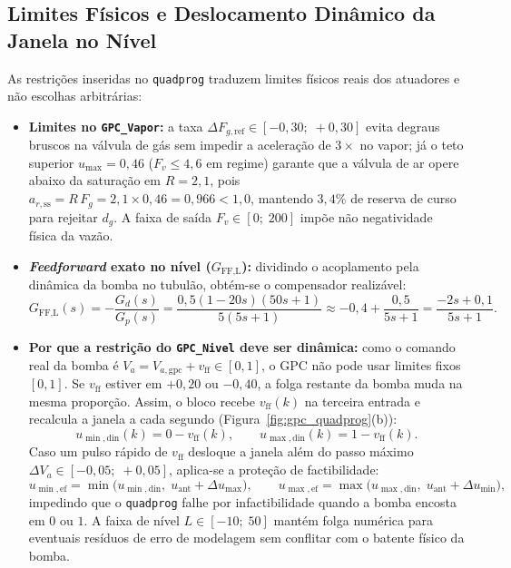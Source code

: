 \documentclass[12pt,a4paper]{article}
\begin{document}
\subsection{Limites F\'isicos e Deslocamento Din\^amico da Janela no N\'ivel}
As restri\c{c}\~oes inseridas no \texttt{quadprog} traduzem limites f\'isicos reais dos atuadores e n\~ao escolhas arbitr\'arias:
\begin{itemize}
    \item \textbf{Limites no \texttt{GPC\_Vapor}:} a taxa $\Delta F_{g,\text{ref}} \in [-0{,}30;\; +0{,}30]$ evita degraus bruscos na v\'alvula de g\'as sem impedir a acelera\c{c}\~ao de $3\times$ no vapor; j\'a o teto superior $u_{\max} = 0{,}46$ ($F_v \leq 4{,}6$ em regime) garante que a v\'alvula de ar opere abaixo da satura\c{c}\~ao em $R = 2{,}1$, pois $a_{r,\text{ss}} = R\,F_g = 2{,}1 \times 0{,}46 = 0{,}966 < 1{,}0$, mantendo $3{,}4\%$ de reserva de curso para rejeitar $d_g$. A faixa de sa\'ida $F_v \in [0;\; 200]$ imp\~oe n\~ao negatividade f\'isica da vaz\~ao.
    \item \textbf{\textit{Feedforward} exato no n\'ivel ($G_{\text{FF,L}}$):} dividindo o acoplamento pela din\^amica da bomba no tubul\~ao, obt\'em-se o compensador realiz\'avel:
    \begin{equation}
        G_{\text{FF,L}}(s) = -\frac{G_d(s)}{G_p(s)} = \frac{0{,}5(1 - 20s)(50s + 1)}{5(5s + 1)} \approx -0{,}4 + \frac{0{,}5}{5s + 1} = \frac{-2s + 0{,}1}{5s + 1}.
    \end{equation}
    \item \textbf{Por que a restri\c{c}\~ao do \texttt{GPC\_Nivel} deve ser din\^amica:} como o comando real da bomba \'e $V_a = V_{a,\text{gpc}} + v_{\text{ff}} \in [0, 1]$, o GPC n\~ao pode usar limites fixos $[0, 1]$. Se $v_{\text{ff}}$ estiver em $+0{,}20$ ou $-0{,}40$, a folga restante da bomba muda na mesma propor\c{c}\~ao. Assim, o bloco recebe $v_{\text{ff}}(k)$ na terceira entrada e recalcula a janela a cada segundo (Figura~\ref{fig:gpc_quadprog}(b)):
    \begin{equation}
        u_{\min,\text{din}}(k) = 0 - v_{\text{ff}}(k), \qquad u_{\max,\text{din}}(k) = 1 - v_{\text{ff}}(k).
    \end{equation}
    Caso um pulso r\'apido de $v_{\text{ff}}$ desloque a janela al\'em do passo m\'aximo $\Delta V_a \in [-0{,}05;\; +0{,}05]$, aplica-se a prote\c{c}\~ao de factibilidade:
    \begin{equation}
        u_{\min,\text{ef}} = \min\!\big(u_{\min,\text{din}},\; u_{\text{ant}} + \Delta u_{\max}\big), \qquad u_{\max,\text{ef}} = \max\!\big(u_{\max,\text{din}},\; u_{\text{ant}} + \Delta u_{\min}\big),
    \end{equation}
    impedindo que o \texttt{quadprog} falhe por infactibilidade quando a bomba encosta em $0$ ou $1$. A faixa de n\'ivel $L \in [-10;\; 50]$ mant\'em folga num\'erica para eventuais res\'iduos de erro de modelagem sem conflitar com o batente f\'isico da bomba.
\end{itemize}
\end{document}
